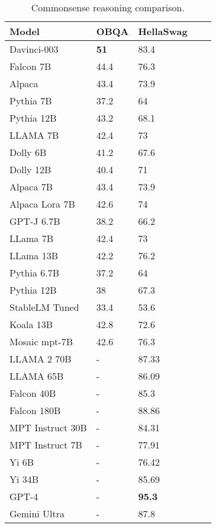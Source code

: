 \documentclass[conference]{IEEEtran}
\begin{document}
\begin{table}[H]
    \centering
    \caption{Commonsense reasoning comparison.} \label{table:commonsense_reasoning}
    \begin{tabular}{|l|l|l|l|l|}
    \hline
        Model            & OBQA & HellaSwag \\ \hline
Davinci-003      & \textbf{51}   & 83.4      \\ \hline
Falcon 7B        & 44.4 & 76.3      \\ \hline
Alpaca           & 43.4 & 73.9      \\ \hline
Pythia 7B        & 37.2 & 64        \\ \hline
Pythia 12B       & 43.2 & 68.1      \\ \hline
LLAMA 7B         & 42.4 & 73        \\ \hline
Dolly 6B         & 41.2 & 67.6      \\ \hline
Dolly 12B        & 40.4 & 71        \\ \hline
Alpaca 7B        & 43.4 & 73.9      \\ \hline
Alpaca Lora 7B   & 42.6 & 74        \\ \hline
GPT-J 6.7B       & 38.2 & 66.2      \\ \hline
LLama 7B         & 42.4 & 73        \\ \hline
LLama 13B        & 42.2 & 76.2      \\ \hline
Pythia 6.7B      & 37.2 & 64        \\ \hline
Pythia 12B       & 38   & 67.3      \\ \hline
StableLM Tuned   & 33.4 & 53.6      \\ \hline
Koala 13B        & 42.8 & 72.6      \\ \hline
Mosaic mpt-7B    & 42.6 & 76.3      \\ \hline \hline
LLAMA 2 70B      & -    & 87.33     \\ \hline
LLAMA 65B        & -    & 86.09     \\ \hline
Falcon 40B       & -    & 85.3      \\ \hline
Falcon 180B      & -    & 88.86     \\ \hline
MPT Instruct 30B & -    & 84.31     \\ \hline
MPT Instruct 7B  & -    & 77.91     \\ \hline
Yi 6B            & -    & 76.42     \\ \hline
Yi 34B           & -    & 85.69     \\ \hline
GPT-4             & -    & \textbf{95.3}      \\ \hline
Gemini Ultra     & -    & 87.8      \\ \hline
    \end{tabular}
\end{table}
\end{document}
